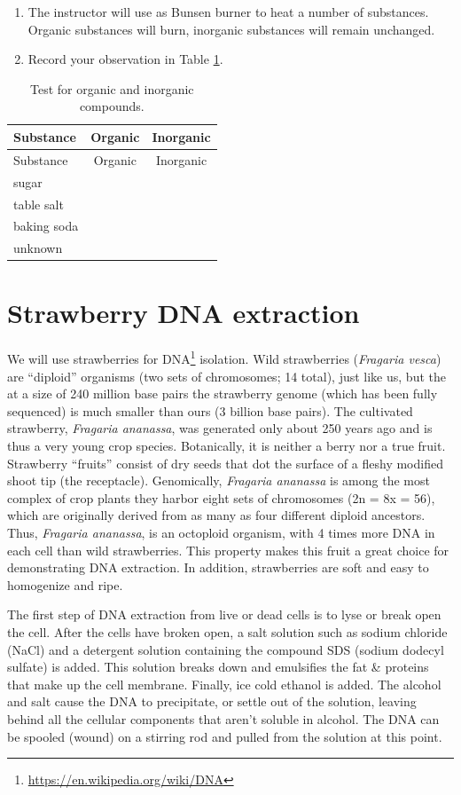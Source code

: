 \documentclass[]{book}
\providecommand{\tightlist}{%
  \setlength{\itemsep}{0pt}\setlength{\parskip}{0pt}}
\let\rmarkdownfootnote\footnote%
\def\footnote{\protect\rmarkdownfootnote}
\renewcommand{\href}[2]{#2\footnote{\url{#1}}}
\begin{document}
\begin{enumerate}
\def\labelenumi{\arabic{enumi}.}
\tightlist
\item
  The instructor will use as Bunsen burner to heat a number of substances. Organic substances will burn, inorganic substances will remain unchanged.
\item
  Record your observation in Table \ref{tab:organic}.
\end{enumerate}

\begin{longtable}[]{@{}lcc@{}}
\caption{\label{tab:organic} Test for organic and inorganic compounds.}\tabularnewline
\toprule
Substance & Organic & Inorganic\tabularnewline
\midrule
\endfirsthead
\toprule
Substance & Organic & Inorganic\tabularnewline
\midrule
\endhead
sugar & &\tabularnewline
table salt & &\tabularnewline
baking soda & &\tabularnewline
unknown & &\tabularnewline
\bottomrule
\end{longtable}

\hypertarget{strawberry-dna-extraction}{%
\section{Strawberry DNA extraction}\label{strawberry-dna-extraction}}

We will use strawberries for \href{https://en.wikipedia.org/wiki/DNA}{DNA} isolation. Wild strawberries (\emph{Fragaria vesca}) are ``diploid'' organisms (two sets of chromosomes; 14 total), just like us, but the at a size of 240 million base pairs the strawberry genome (which has been fully sequenced) is much smaller than ours (3 billion base pairs). The cultivated strawberry, \emph{Fragaria ananassa}, was generated only about 250 years ago and is thus a very young crop species. Botanically, it is neither a berry nor a true fruit. Strawberry ``fruits'' consist of dry seeds that dot the surface of a fleshy modified shoot tip (the receptacle). Genomically, \emph{Fragaria ananassa} is among the most complex of crop plants they harbor eight sets of chromosomes (2n = 8x = 56), which are originally derived from as many as four different diploid ancestors. Thus, \emph{Fragaria ananassa}, is an octoploid organism, with 4 times more DNA in each cell than wild strawberries. This property makes this fruit a great choice for demonstrating DNA extraction. In addition, strawberries are soft and easy to homogenize and ripe.

The first step of DNA extraction from live or dead cells is to lyse or break open the cell. After the cells have broken open, a salt solution such as sodium chloride (NaCl) and a detergent solution containing the compound SDS (sodium dodecyl sulfate) is added. This solution breaks down and emulsifies the fat \& proteins that make up the cell membrane. Finally, ice cold ethanol is added. The alcohol and salt cause the DNA to precipitate, or settle out of the solution, leaving behind all the cellular components that aren't soluble in alcohol. The DNA can be spooled (wound) on a stirring rod and pulled from the solution at this point.
\end{document}
